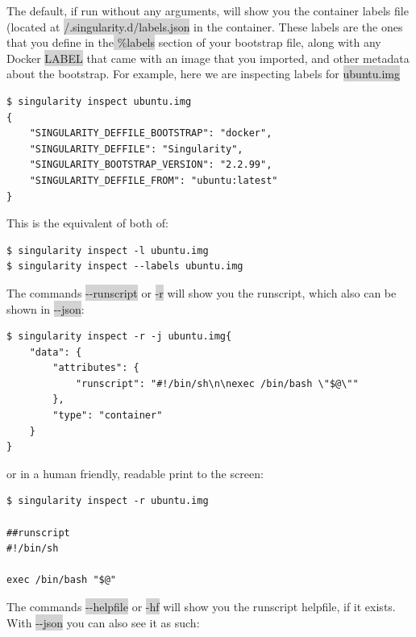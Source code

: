 \documentclass[a4paper]{article}
\newcounter{subsubsubsection}[subsubsection]
\begin{document}
	
	The default, if run without any arguments, will show you the container labels file (located at \colorbox{lightgray}{/.singularity.d/labels.json} in the container. These labels are the ones that you define in the\colorbox{lightgray}{ \%labels} section of your bootstrap file, along with any Docker \colorbox{lightgray}{LABEL} that came with an image that you imported, and other metadata about the bootstrap. For example, here we are inspecting labels for \colorbox{lightgray}{ ubuntu.img}

\begin{lstlisting}[frame=single]
$ singularity inspect ubuntu.img
{
    "SINGULARITY_DEFFILE_BOOTSTRAP": "docker",
    "SINGULARITY_DEFFILE": "Singularity",
    "SINGULARITY_BOOTSTRAP_VERSION": "2.2.99",
    "SINGULARITY_DEFFILE_FROM": "ubuntu:latest"
}
\end{lstlisting}

This is the equivalent of both of:\\[0.1in]	
\begin{lstlisting}[frame=single]
$ singularity inspect -l ubuntu.img
$ singularity inspect --labels ubuntu.img
\end{lstlisting}
	
	
	The commands \colorbox{lightgray}{-{}-runscript} or \colorbox{lightgray}{-r} will show you the runscript, which also can be shown in \colorbox{lightgray}{-{}-json}:
	
\begin{lstlisting}[frame=single]
$ singularity inspect -r -j ubuntu.img{
    "data": {
        "attributes": {
            "runscript": "#!/bin/sh\n\nexec /bin/bash \"$@\""
        },
        "type": "container"
    }
}
\end{lstlisting}	
or in a human friendly, readable print to the screen:

\begin{lstlisting}[frame=single]
$ singularity inspect -r ubuntu.img

##runscript
#!/bin/sh

exec /bin/bash "$@"

\end{lstlisting}

	
	The commands \colorbox{lightgray}{-{}-helpfile} or \colorbox{lightgray}{-hf} will show you the runscript helpfile, if it exists. With \colorbox{lightgray}{-{}-json} you can also see it as such:\\[0.1in]
	
\end{document}
